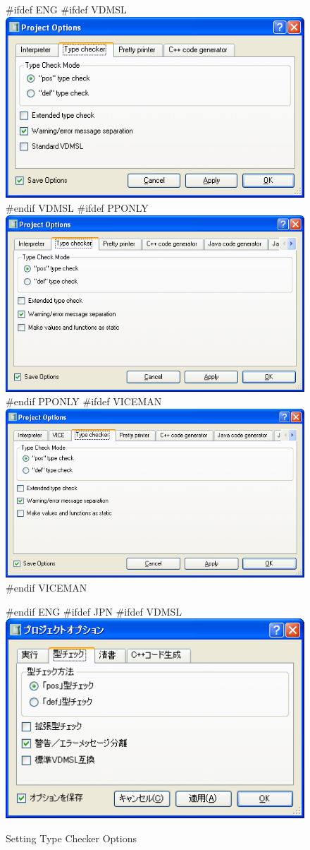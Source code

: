 \documentclass[\pformat,12pt]{article}
\begin{document}
\begin{figure}[tbh]
\begin{center}
#ifdef ENG
#ifdef VDMSL
\includegraphics[width=12cm]{tcOptions-slENG.png}
#endif VDMSL
#ifdef PPONLY
\includegraphics[width=12cm]{tcOptions-ppENG.png}
#endif PPONLY
#ifdef VICEMAN
\includegraphics[width=12cm]{tcOptions-viceENG.png}
#endif VICEMAN
\caption{Setting Type Checker Options}
#endif ENG
#ifdef JPN
#ifdef VDMSL
\includegraphics[width=12cm]{tcOptions-sl.png}

\end{center}
\end{figure}
\end{document}
